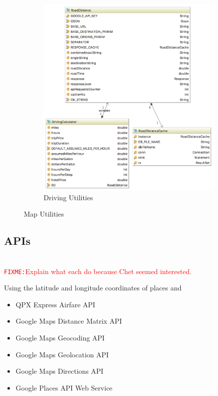 \documentclass[11pt]{article}
\newcommand{\FIXME}[1]{ \ \\ \hspace* {-1.5 cm}
  \textcolor{red}{\texttt{FIXME:}#1} \medskip\par}
\begin{document}
\begin{figure}
\begin{subfigure}{.6\textwidth}
  \includegraphics[width=1\linewidth]{driveuml}
  \caption{Driving Utilities}
  \label{fig:drivuml}
\end{subfigure}
\caption{Map Utilities}
\label{fig:util}
\end{figure}

\subsection{APIs}

\FIXME{Explain what each do because Chet seemed interested.}

Using the latitude and longitude coordinates of places and 

\begin{itemize}
\item QPX Express Airfare API
\item Google Maps Distance Matrix API
\item Google Maps Geocoding API
\item Google Maps Geolocation API
\item Google Maps Directions API
\item Google Places API Web Service
\end{itemize}
\end{document}
